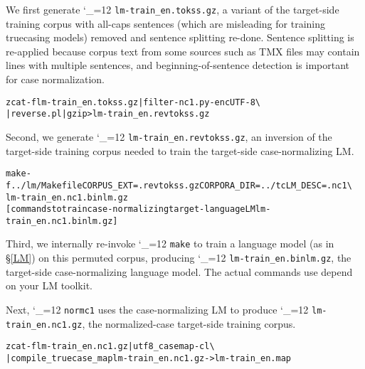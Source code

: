 \documentclass[11pt,letterpaper]{article}
\newcommand{\bs}{\textbackslash{}}
\def\code{\begingroup\catcode`\_=12 \codex}
\newcommand{\codex}[1]{\texttt{#1}\endgroup}
\begin{document}
We first generate \code{lm-train_en.tokss.gz}, a variant of the target-side
training corpus with all-caps sentences (which are misleading for training
truecasing models) removed and sentence splitting re-done.  Sentence splitting
is re-applied because corpus text from some sources such as TMX files may
contain lines with multiple sentences, and beginning-of-sentence detection is
important for case normalization.

\begin{small}
\begin{alltt}
   zcat -f lm-train_en.tokss.gz | filter-nc1.py -enc UTF-8 \bs
        | reverse.pl | gzip > lm-train_en.revtokss.gz
\end{alltt}
\end{small}

Second, we generate \code{lm-train_en.revtokss.gz}, an inversion of the
target-side training corpus needed to train the target-side case-normalizing
LM.

\begin{small}
\begin{alltt}
   make -f ../lm/Makefile CORPUS_EXT=.revtokss.gz CORPORA_DIR=../tc LM_DESC=.nc1 \bs
        lm-train_en.nc1.binlm.gz
   [commands to train case-normalizing target-language LM lm-train_en.nc1.binlm.gz]
\end{alltt}
\end{small}

Third, we internally re-invoke \code{make} to train a language model (as in
\S\ref{LM}) on this permuted corpus, producing \code{lm-train_en.binlm.gz},
the target-side case-normalizing language model.  The actual commands use
depend on your LM toolkit.


Next, \code{normc1} uses the case-normalizing LM to produce
\code{lm-train_en.nc1.gz}, the nor\-malized-case target-side training corpus.

\begin{small}
\begin{alltt}
   zcat -f lm-train_en.nc1.gz |  utf8_casemap -c l \bs
        | compile_truecase_map lm-train_en.nc1.gz - > lm-train_en.map
\end{alltt}
\end{small}
\end{document}

